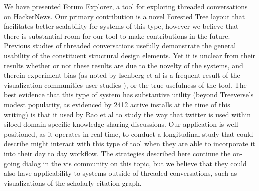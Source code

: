 \documentclass{egpubl}
\begin{document}
We have presented Forum Explorer, a tool for exploring threaded conversations on HackerNews. 
%
Our primary contribution is a novel Forested Tree layout that facilitates better scalability for systems of this type, however we believe that there is substantial room for our tool to make contributions in the future.
%
Previous studies of threaded conversations usefully demonstrate the general usability of the constituent structural design elements.
%
Yet it is unclear from their results whether or not these results are due to the novelty of the systems, and therein experiment bias (as noted by Isenberg et al is a frequent result of the visualization communities user studies \cite{isenberg2013systematic}), or the true usefulness of the tool.
%
The best evidence that this type of system has substantive utility (beyond Treeverse's modest popularity, as evidenced by 2412 active installs at the time of this writing) is that it used by Rao et al \cite{twittercanoes} to study the way that twitter is used within siloed domain specific knowledge sharing discussions.
%
Our application is well positioned, as it operates in real time, to conduct a longitudinal study that could describe might interact with this type of tool when they are able to incorporate it into their day to day workflow.
%
The strategies described here continue the on-going dialog in the vis community on this topic, but we believe that they could also have applicability to systems outside of threaded conversations, such as visualizations of the scholarly citation graph.










%



\end{document}
